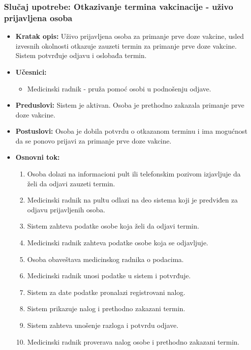 \documentclass[titlepage]{article}
\begin{document}
\subsubsection{Slučaj upotrebe: Otkazivanje termina vakcinacije - uživo prijavljena osoba}
\begin{itemize}
    \item \textbf{Kratak opis:} Uživo prijavljena osoba za primanje prve doze vakcine, usled izvesnih okolnosti otkazuje zauzeti termin za primanje prve doze vakcine. Sistem potvrđuje odjavu i oslobađa termin.
    \item \textbf{Učesnici:}
        \begin{itemize}
	    \item Medicinski radnik - pruža pomoć osobi u podnošenju odjave.
	\end{itemize}
    \item \textbf{Preduslovi:} Sistem je aktivan. Osoba je prethodno zakazala primanje prve doze vakcine.
    \item \textbf{Postuslovi:} Osoba je dobila potvrdu o otkazanom terminu i ima mogućnost da se ponovo prijavi za primanje prve doze vakcine.
    \item \textbf{Osnovni tok:}
        \begin{enumerate}
            \item Osoba dolazi na informacioni pult ili telefonskim pozivom izjavljuje da želi da odjavi zauzeti termin.
	    \item Medicinski radnik na pultu odlazi na deo sistema koji je predviđen za odjavu prijavljenih osoba.
	    \item Sistem zahteva podatke osobe koja želi da odjavi termin.
	    \item Medicinski radnik zahteva podatke osobe koja se odjavljuje.
	    \item Osoba obaveštava medicinskog radnika o podacima.
	    \item Medicinski radnik unosi podatke u sistem i potvrđuje.
            \item Sistem za date podatke pronalazi registrovani nalog.
	    \item Sistem prikazuje nalog i prethodno zakazani termin.
	    \item Sistem zahteva unošenje razloga i potvrdu odjave.
	    \item Medicinski radnik proverava nalog osobe i prethodno zakazani termin.

\end{enumerate}
\end{itemize}
\end{document}
